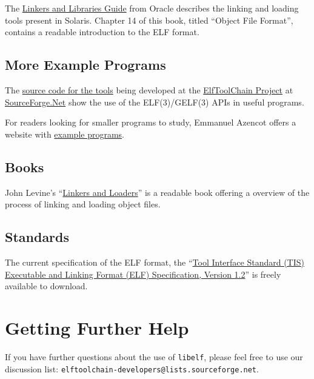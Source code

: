 \documentclass[a4paper,pdftex]{book}
\newcommand{\elftoolchainproject}{\href{https://elftoolchain.sourceforge.io/}%
    {ElfToolChain Project}\xspace}%
\newcommand{\library}[1]{\texttt{#1}}
\newcommand{\reg}{\textregistered\xspace}
\newcommand{\trade}{\texttrademark\xspace}
\begin{document}
The
\href{https://docs.oracle.com/cd/E53394_01/html/E54813/index.html}{Linkers
and Libraries Guide} from Oracle\reg describes the linking and
loading tools present in Solaris\trade.  Chapter 14 of this book,
titled ``Object File Format'', contains a readable introduction to the
ELF format.

\subsection{More Example Programs}

The
\href{https://sourceforge.net/p/elftoolchain/code/HEAD/tree/trunk/}%
{source code for the tools} being developed at the
\elftoolchainproject at \href{https://sourceforge.net/}{SourceForge.Net}
show the use of the ELF(3)/GELF(3) APIs in useful programs.

For readers looking for smaller programs to study, Emmanuel Azencot
offers a website with
\href{http://freemanu1.free.fr/elf_examples/index.html}{example
  programs}.

\subsection{Books}

John Levine's
``\href{https://linker.iecc.com/}{Linkers and Loaders}'' is a readable
book offering a overview of the process of linking and loading object
files.

\subsection{Standards}

The current specification of the ELF
format, the ``\href{https://refspecs.linuxbase.org/elf/elf.pdf}%
{Tool Interface Standard (TIS) Executable and Linking Format
(ELF) Specification, Version 1.2}'' is freely available to download.

\section{Getting Further Help}

If you have further questions about
the use of \library{libelf}, please feel free to use our discussion
list: \texttt{elftoolchain-\-developers@lists.sourceforge.net}.

\backmatter

\printindex
\end{document}
